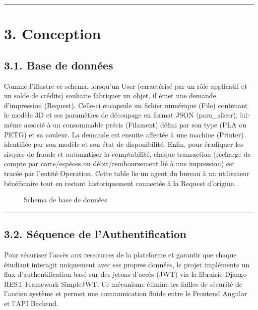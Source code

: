 \begin{center}\rule{0.5\linewidth}{0.5pt}\end{center}

\newpage

\hypertarget{conception}{%
\section{3. Conception}\label{conception}}

\hypertarget{base-de-donnuxe9es}{%
\subsection{3.1. Base de données}\label{base-de-donnuxe9es}}

Comme l'illustre ce schema, lorsqu'un User (caractérisé par un rôle
applicatif et un solde de crédits) souhaite fabriquer un objet, il émet
une demande d'impression (Request). Celle-ci encapsule un fichier
numérique (File) contenant le modèle 3D et ses paramètres de découpage
en format JSON (para\_slicer), lui-même associé à un consommable précis
(Filament) défini par son type (PLA ou PETG) et sa couleur. La demande
est ensuite affectée à une machine (Printer) identifiée par son modèle
et son état de disponibilité. Enfin, pour éradiquer les risques de
fraude et automatiser la comptabilité, chaque transaction (recharge de
compte par carte/espèces ou débit/remboursement lié à une impression)
est tracée par l'entité Operation. Cette table lie un agent du bureau à
un utilisateur bénéficiaire tout en restant historiquement connectée à
la Request d'origine.

\begin{figure}
\centering

\caption{Schema de base de données}
\end{figure}

\begin{center}\rule{0.5\linewidth}{0.5pt}\end{center}

\newpage

\hypertarget{suxe9quence-de-lauthentification}{%
\subsection{3.2. Séquence de
l'Authentification}\label{suxe9quence-de-lauthentification}}

Pour sécuriser l'accès aux ressources de la plateforme et garantir que
chaque étudiant interagit uniquement avec ses propres données, le projet
implémente un flux d'authentification basé sur des jetons d'accès (JWT)
via la librairie Django REST Framework SimpleJWT. Ce mécanisme élimine
les failles de sécurité de l'ancien système et permet une communication
fluide entre le Frontend Angular et l'API Backend.

